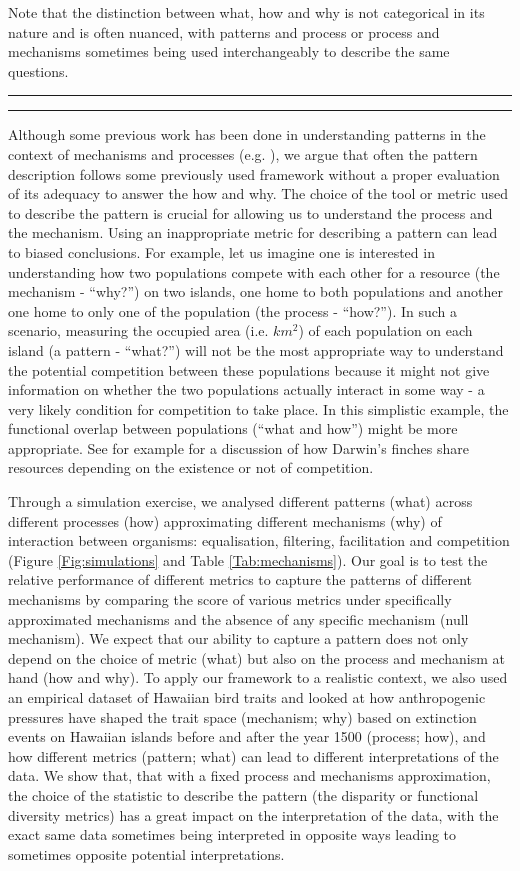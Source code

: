 \documentclass[12pt,letterpaper]{article}
\begin{document}
Note that the distinction between what, how and why is not categorical in its nature and is often nuanced, with patterns and process or process and mechanisms sometimes being used interchangeably to describe the same questions.

\bigskip
\hrule
\hrule
\bigskip

Although some previous work has been done in understanding patterns in the context of mechanisms and processes (e.g. \cite{novack2016general1,novack2016general2}), we argue that often the pattern description follows some previously used framework without a proper evaluation of its adequacy to answer the how and why.
The choice of the tool or metric used to describe the pattern is crucial for allowing us to understand the process and the mechanism.
Using an inappropriate metric for describing a pattern can lead to biased conclusions.
For example, let us imagine one is interested in understanding how two populations compete with each other for a resource (the mechanism - ``why?'') on two islands, one home to both populations and another one home to only one of the population (the process - ``how?'').
In such a scenario, measuring the occupied area (i.e. $km^{2}$) of each population on each island (a pattern - ``what?'') will not be the most appropriate way to understand the potential competition between these populations because it might not give information on whether the two populations actually interact in some way - a very likely condition for competition to take place.
In this simplistic example, the functional overlap between populations (``what and how'') might be more appropriate.
See for example \citealt{carvalho2020decomposing} for a discussion of how Darwin's finches share resources depending on the existence or not of competition.

Through a simulation exercise, we analysed different patterns (what) across different processes (how) approximating different mechanisms (why) of interaction between organisms: equalisation, filtering, facilitation and competition (Figure \ref{Fig:simulations} and Table \ref{Tab:mechanisms}).
Our goal is to test the relative performance of different metrics to capture the patterns of different mechanisms by comparing the score of various metrics under specifically approximated mechanisms and the absence of any specific mechanism (null mechanism).
We expect that our ability to capture a pattern does not only depend on the choice of metric (what) but also on the process and mechanism at hand (how and why).
To apply our framework to a realistic context, we also used an empirical dataset of Hawaiian bird traits and looked at how anthropogenic pressures have shaped the trait space (mechanism; why) based on extinction events on Hawaiian islands before and after the year 1500 (process; how), and how different metrics (pattern; what) can lead to different interpretations of the data.
We show that, that with a fixed process and mechanisms approximation, the choice of the statistic to describe the pattern (the disparity or functional diversity metrics) has a great impact on the interpretation of the data, with the exact same data sometimes being interpreted in opposite ways leading to sometimes opposite potential interpretations.
\end{document}
